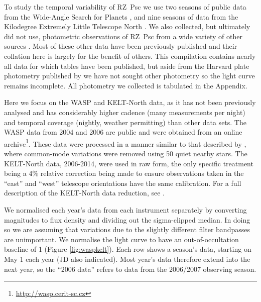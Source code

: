 \documentclass[useAMS,usenatbib,usegraphicx]{mn2e}
\begin{document}
To study the temporal variability of RZ~Psc we use two seasons of public data from the
Wide-Angle Search for Planets \citep[WASP,][]{2006PASP..118.1407P}, and nine seasons of
data from the Kilodegree Extremely Little Telescope North
\citep[KELT-North,][]{2007PASP..119..923P}. We also collected, but ultimately did not
use, photometric observations of RZ~Psc from a wide variety of other sources \citep[][,
the Catalina Sky Survey, the American Association of Variable Star Observers, the All-Sky
Automated
Survey]{1994AJ....108.1906H,1973IBVS..783....1K,1980PZ.....21..310K,1985PZ.....22..181Z,1991Afz....34..333K,1997AcA....47..467P,2014Ap.....57..491P}. Most
of these other data have been previously published and their collation here is largely
for the benefit of others. This compilation contains nearly all data for which tables
have been published, but aside from the Harvard plate photometry published by
\citet{1999A&AS..140..293G} we have not sought other photometry so the light curve
remains incomplete. All photometry we collected is tabulated in the Appendix.

Here we focus on the WASP and KELT-North data, as it has not been previously analysed and
has considerably higher cadence (many measurements per night) and temporal coverage
(nightly, weather permitting) than other data sets. The WASP data from 2004 and 2006 are
public and were obtained from an online
archive\footnote{\href{http://wasp.cerit-sc.cz}{http://wasp.cerit-sc.cz}}. These data
were processed in a manner similar to that described by \citet{2014MNRAS.441.2845V},
where common-mode variations were removed using 50 quiet nearby stars. The KELT-North
data, 2006-2014, were used in raw form, the only specific treatment being a 4\% relative
correction being made to ensure observations taken in the ``east'' and ``west'' telescope
orientations have the same calibration. For a full description of the KELT-North data
reduction, see \citet{2012ApJ...761..123S}.

We normalised each year's data from each instrument separately by converting magnitudes
to flux density and dividing out the sigma-clipped median. In doing so we are assuming
that variations due to the slightly different filter bandpasses are unimportant. We
normalise the light curve to have an out-of-occultation baseline of 1 (Figure
\ref{fig:waspkelt}). Each row shows a season's data, starting on May 1 each year (JD also
indicated). Most year's data therefore extend into the next year, so the ``2006 data''
refers to data from the 2006/2007 observing season.
\end{document}
